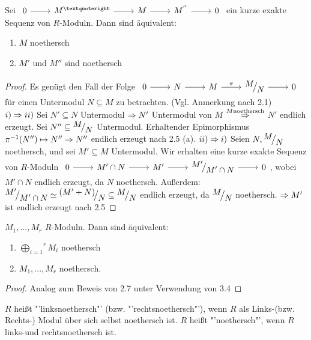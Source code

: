 \begin{bem}
	Sei $\begin{tikzcd}
	0  \arrow{r} & M^{’} \arrow{r}{} & M \arrow{r}{} & M^{''} \arrow{r} & 0
	\end{tikzcd} $ ein kurze exakte Sequenz von $R$-Moduln. Dann sind äquivalent: 
	\begin{enumerate} [label= \roman*)]
		\item $M$ noethersch
		\item $M'$ und $M''$ sind noethersch
	\end{enumerate}
\end{bem}
\begin{proof}
	Es genügt den Fall der Folge $\begin{tikzcd}
	0  \arrow{r} & N\arrow{r}{} & M \arrow{r}{\pi} & \QR{M}{N} \arrow{r} & 0
	\end{tikzcd} $ für einen Untermodul $N \subseteq M $ zu betrachten. (Vgl. Anmerkung nach 2.1)\\
	$i) \Rightarrow ii)$ Sei $N' \subseteq N $ Untermodul $\Rightarrow N' $ Untermodul von $M$ $\overset{M \text{noethersch}}{\Rightarrow} $ $N' $ endlich erzeugt. Sei $N'' \subseteq \QR{M}{N}$ Untermodul. Erhaltender Epimorphismus $\pi^{-1}(N'') \mapsto N'' \Rightarrow N'' $ endlich erzeugt nach 2.5 (a). 
	$ii) \Rightarrow i)$ Seien $N, \QR{M}{N}$ noethersch, und sei $M' \subseteq M $ Untermodul. Wir erhalten eine kurze exakte Sequenz von $R$-Moduln  $\begin{tikzcd}
	0  \arrow{r} & M' \cap N \arrow{r}{} & M' \arrow{r}{} & \QR{M'}{M' \cap N} \arrow{r} & 0
	\end{tikzcd} $, wobei $M' \cap N $ endlich erzeugt, da $N$ noethersch. Außerdem: $\QR{M'}{M' \cap N} \simeq \QR{(M'+N)}{N} \subseteq \QR{M}{N} $ endlich erzeugt, da $\QR{M}{N} $ noethersch. $\Rightarrow M' $ ist endlich erzeugt nach 2.5
\end{proof}
\begin{bem}
	$M_1,...,M_r$ $R$-Moduln. Dann sind äquivalent: 
	\begin{enumerate} [label= \roman*)]
		\item $\overset{r}{\bigoplus_{i=1}} M_i $ noethersch 
		\item $M_1,...,M_r $ noethersch.
	\end{enumerate}
\end{bem}
\begin{proof}
	Analog zum Beweis von 2.7 unter Verwendung von 3.4
\end{proof}
\begin{df}
	$R$ heißt "'linksnoethersch"' (bzw. "'rechtsnoethersch"'), wenn $R$ als Links-(bzw. Rechts-) Modul über sich selbst noethersch ist. $R$ heißt "'noethersch"', wenn $R$ links-und rechtsnoethersch ist.
\end{df}
